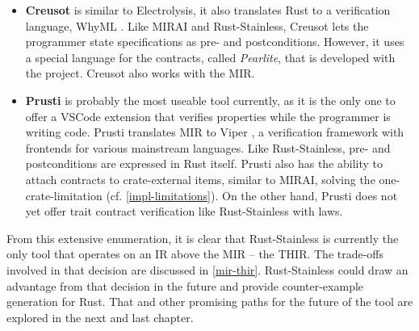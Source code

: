 \begin{itemize}
\item \textbf{Creusot} \cite{creusot} is similar to Electrolysis, it also
translates Rust to a verification language, WhyML \cite{why3}. Like MIRAI and
Rust-Stainless, Creusot lets  the programmer state specifications as pre- and
postconditions. However, it uses a special language for the contracts, called
\emph{Pearlite}, that is developed with the project. Creusot also works with the
MIR.

\item \textbf{Prusti} \cite{prusti} is probably the most useable tool currently,
as it is the only one to offer a VSCode extension that verifies properties
while the programmer is writing code. Prusti translates MIR to Viper
\cite{viper}, a verification framework with frontends for various mainstream
languages. Like Rust-Stainless, pre- and postconditions are expressed in Rust
itself. Prusti also has the ability to attach contracts to crate-external items,
similar to MIRAI, solving the one-crate-limitation (cf.
\autoref{impl-limitations}). On the other hand, Prusti does not yet offer trait
contract verification like Rust-Stainless with laws.

\end{itemize}

\hfill \break \noindent  From this extensive enumeration, it is clear that
Rust-Stainless is currently the only tool that operates on an IR above the MIR
-- the THIR. The trade-offs involved in that decision are discussed in
\autoref{mir-thir}. Rust-Stainless could draw an advantage from that decision in
the future and provide counter-example generation for Rust. That and other
promising paths for the future of the tool are explored in the next and last
chapter.
